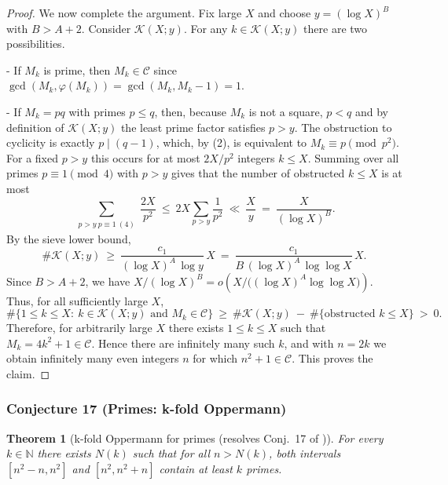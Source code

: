 \documentclass[12pt]{article}
\newtheorem{theorem}{Theorem}
\theoremstyle{remark}
\begin{document}
\begin{proof}
We now complete the argument. Fix large $X$ and choose $y=(\log X)^B$ with $B>A+2$. Consider $\mathcal K(X;y)$. For any $k\in\mathcal K(X;y)$ there are two possibilities.

- If $M_k$ is prime, then $M_k\in\mathcal C$ since $\gcd(M_k,\varphi(M_k))=\gcd(M_k,M_k-1)=1$.

- If $M_k=pq$ with primes $p\le q$, then, because $M_k$ is not a square, $p<q$ and by definition of $\mathcal K(X;y)$ the least prime factor satisfies $p>y$. The obstruction to cyclicity is exactly $p\mid(q-1)$, which, by (2), is equivalent to $M_k\equiv p\pmod{p^2}$. For a fixed $p>y$ this occurs for at most $2X/p^2$ integers $k\le X$. Summing over all primes $p\equiv1\pmod4$ with $p>y$ gives that the number of obstructed $k\le X$ is at most
$$
\sum_{\substack{p>y\ p\equiv1\ (4)}} \frac{2X}{p^2}\ \le\ 2X\sum_{p>y}\frac{1}{p^2}\ \ll\ \frac{X}{y}\ =\ \frac{X}{(\log X)^B}.
$$
By the sieve lower bound,
$$
\#\mathcal K(X;y)\ \ge\ \frac{c_1}{(\log X)^{A}\,\log y}\,X\ =\ \frac{c_1}{B\,(\log X)^{A}\,\log\log X}\,X.
$$
Since $B>A+2$, we have $X/(\log X)^B=o\!\left(X/\bigl((\log X)^A\log\log X\bigr)\right)$. Thus, for all sufficiently large $X$,
$$
\#\{1\le k\le X:\ k\in\mathcal K(X;y)\text{ and }M_k\in\mathcal C\}
\ \ge\ \#\mathcal K(X;y)\ -\ \#\{\text{obstructed }k\le X\}
\ >\ 0.
$$
Therefore, for arbitrarily large $X$ there exists $1\le k\le X$ such that $M_k=4k^2+1\in\mathcal C$. Hence there are infinitely many such $k$, and with $n=2k$ we obtain infinitely many even integers $n$ for which $n^2+1\in\mathcal C$. This proves the claim. 
\end{proof}


\subsubsection{Conjecture 17 (Primes: k-fold Oppermann)}
\begin{theorem}[k-fold Oppermann for primes (resolves Conj.~17 of \cite{Cohen2025})]\label{thm:k_fold_oppermann_for_primes}
For every $k\in\mathbb{N}$ there exists $N(k)$ such that for all $n>N(k)$, both intervals $[n^2-n,n^2]$ and $[n^2,n^2+n]$ contain at least $k$ primes.
\end{theorem}
\end{document}
